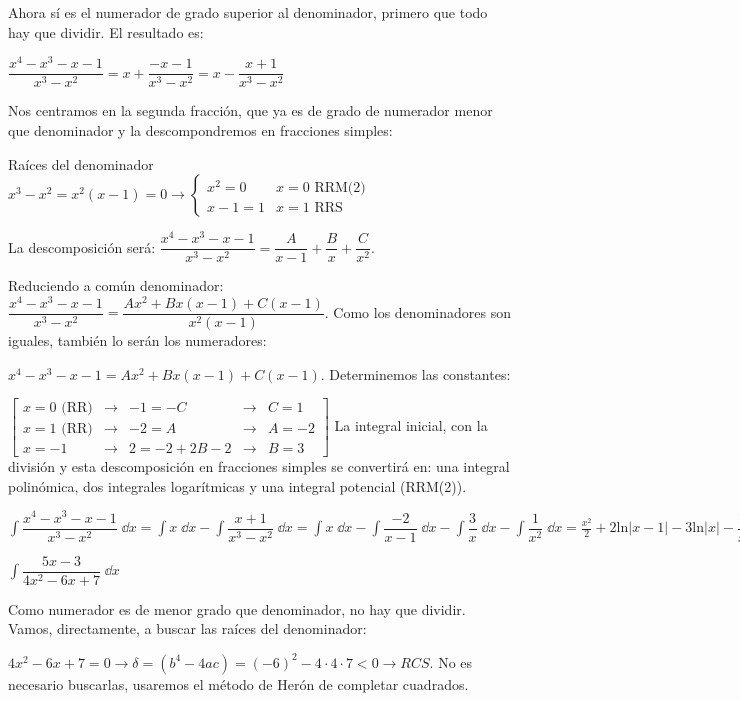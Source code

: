 {\begin{ejem}
Ahora sí es el numerador de grado superior al denominador, primero que todo hay que dividir. El resultado es:

$\dfrac {x^4-x^3-x-1}{x^3-x^2}= x + \dfrac {-x-1}{x^3-x^2}=x - \dfrac {x+1}{x^3-x^2}$

Nos centramos en la segunda fracción, que ya es de grado de numerador menor que denominador y la descompondremos en fracciones simples:

Raíces del denominador $x^3-x^2=x^2(x-1)=0 \to \begin{cases}
 						x^2=0 & x=0 \text{ RRM(2)} \\
 						x-1=1 & x=1 \text{ RRS}
 						\end{cases}$
 
 La descomposición será: $\dfrac {x^4-x^3-x-1}{x^3-x^2}= \dfrac{A}{x-1} + \dfrac{B}{x} + \dfrac{C}{x^2} $. 
 
 Reduciendo a común denominador:  $\dfrac {x^4-x^3-x-1}{x^3-x^2}= \dfrac {Ax^2 + Bx(x-1)+C(x-1)}{x^2(x-1)} $. Como los denominadores son iguales, también lo serán los numeradores:
 
 $x^4-x^3-x-1= Ax^2 + Bx(x-1)+C(x-1) $. Determinemos las constantes:
 
 $\left[ \begin{matrix} x=0  \text{ (RR)} & \to & -1=-C  & \to & C=1 \\ x=1 \text{ (RR)} & \to & -2=A  & \to & A=-2  \\ x=-1 & \to & 2=-2+2B-2  & \to & B=3 \end{matrix} \right] $ La integral inicial, con la división y esta descomposición en fracciones simples se convertirá en: una integral polinómica, dos integrales logarítmicas y una integral potencial (RRM(2)).
 
 $\displaystyle \int \dfrac {x^4-x^3-x-1}{x^3-x^2}\; \dd x= \int x\; \dd x - \int \dfrac {x+1}{x^3-x^2} \; \dd x= \int x \; \dd x - \int \dfrac {-2}{x-1} \; \dd x - \int \dfrac {3}{x} \; \dd x -\int \dfrac {1}{x^2}\; \dd x = \frac {x^2}{2} +2 \mathrm{ln} |x-1| -3 \mathrm{ln}|x|-\dfrac 1 x + \mathcal C  $

\end{ejem}

\begin{ejem} $\displaystyle \int \dfrac {5x-3}{4x^2-6x+7}\; \dd x$
	
	Como numerador es de menor grado que denominador, no hay que dividir. Vamos, directamente, a buscar las raíces del denominador:
	
	$4x^2-6x+7=0 \to \delta = (b^4-4ac)= (-6)^2-4\cdot 4\cdot 7<0
\to RCS$. No es necesario buscarlas, usaremos el método de Herón de completar cuadrados.


\end{ejem}}
